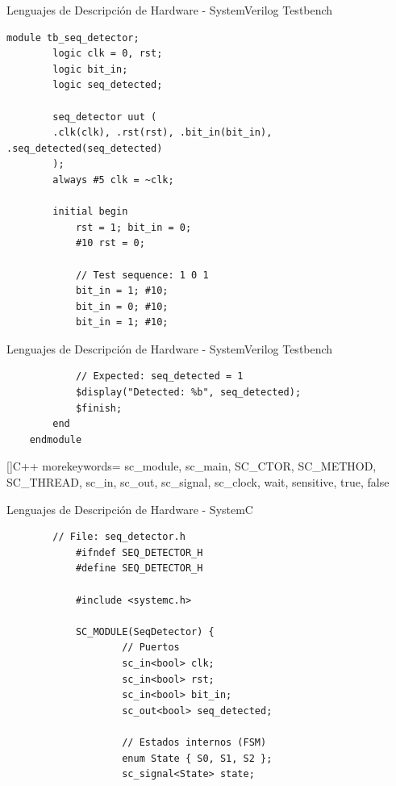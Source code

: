 \documentclass[11pt]{beamer}
\begin{document}
	\begin{frame}[fragile]{Lenguajes de Descripción de Hardware - SystemVerilog Testbench}
	\begin{lstlisting}[caption=Testebench del ejemplo en SystemVerilog]
	module tb_seq_detector;
		logic clk = 0, rst;
		logic bit_in;
		logic seq_detected;
	
		seq_detector uut (
		.clk(clk), .rst(rst), .bit_in(bit_in), .seq_detected(seq_detected)
		);
		always #5 clk = ~clk;
		
		initial begin
			rst = 1; bit_in = 0;
			#10 rst = 0;
			
			// Test sequence: 1 0 1
			bit_in = 1; #10;
			bit_in = 0; #10;
			bit_in = 1; #10;
	\end{lstlisting}
	\end{frame}


	\begin{frame}[fragile]{Lenguajes de Descripción de Hardware - SystemVerilog Testbench}
	\begin{lstlisting}
			// Expected: seq_detected = 1
			$display("Detected: %b", seq_detected);
			$finish;
		end
	endmodule
	\end{lstlisting}
	\end{frame}


[]{C++}{
	morekeywords={
		sc_module, sc_main, SC_CTOR, SC_METHOD, SC_THREAD,
		sc_in, sc_out, sc_signal, sc_clock,
		wait, sensitive, true, false
	}
}


	\begin{frame}[fragile]{Lenguajes de Descripción de Hardware - SystemC}
	\begin{lstlisting}
		// File: seq_detector.h
			#ifndef SEQ_DETECTOR_H
			#define SEQ_DETECTOR_H
			
			#include <systemc.h>
			
			SC_MODULE(SeqDetector) {
					// Puertos
					sc_in<bool> clk;
					sc_in<bool> rst;
					sc_in<bool> bit_in;
					sc_out<bool> seq_detected;
					
					// Estados internos (FSM)
					enum State { S0, S1, S2 };
					sc_signal<State> state; 
		\end{lstlisting}
		\end{frame}
		
\end{document}
